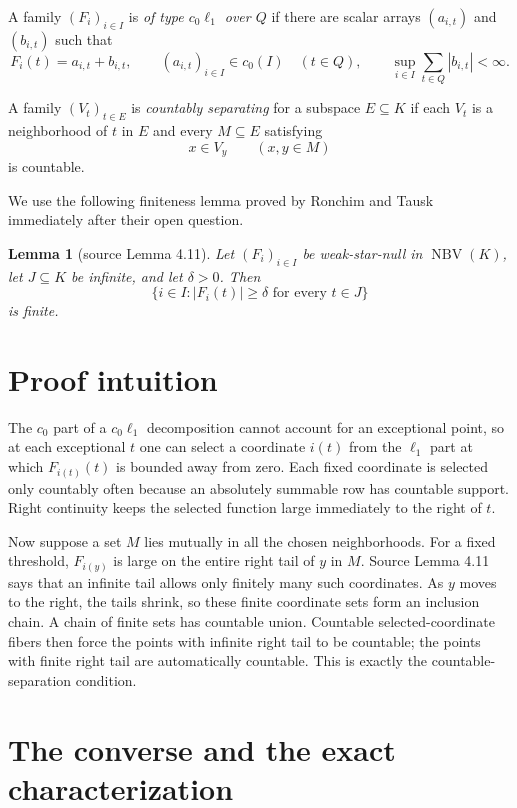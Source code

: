 \documentclass[11pt]{article}
\newtheorem{lemma}[theorem]{Lemma}
\newcommand{\NBV}{\operatorname{NBV}}
\begin{document}
A family $(F_i)_{i\in I}$ is \emph{of type $c_0\ell_1$ over $Q$} if there
are scalar arrays $(a_{i,t})$ and $(b_{i,t})$ such that
\[
 F_i(t)=a_{i,t}+b_{i,t},\qquad
 (a_{i,t})_{i\in I}\in c_0(I)\quad(t\in Q),
 \qquad
 \sup_{i\in I}\sum_{t\in Q}|b_{i,t}|<\infty.
\]

A family $(V_t)_{t\in E}$ is \emph{countably separating} for a subspace
$E\subseteq K$ if each $V_t$ is a neighborhood of $t$ in $E$ and every
$M\subseteq E$ satisfying
\[
 x\in V_y\qquad(x,y\in M)
\]
is countable.

We use the following finiteness lemma proved by Ronchim and Tausk immediately
after their open question.

\begin{lemma}[source Lemma 4.11]\label{lem:source}
Let $(F_i)_{i\in I}$ be weak-star-null in $\NBV(K)$, let $J\subseteq K$ be
infinite, and let $\delta>0$. Then
\[
 \{i\in I: |F_i(t)|\geq\delta\text{ for every }t\in J\}
\]
is finite.
\end{lemma}

\section{Proof intuition}

The $c_0$ part of a $c_0\ell_1$ decomposition cannot account for an
exceptional point, so at each exceptional $t$ one can select a coordinate
$i(t)$ from the $\ell_1$ part at which $F_{i(t)}(t)$ is bounded away from
zero. Each fixed coordinate is selected only countably often because an
absolutely summable row has countable support. Right continuity keeps the
selected function large immediately to the right of $t$.

Now suppose a set $M$ lies mutually in all the chosen neighborhoods. For a
fixed threshold, $F_{i(y)}$ is large on the entire right tail of $y$ in
$M$. Source Lemma 4.11 says that an infinite tail allows only finitely many
such coordinates. As $y$ moves to the right, the tails shrink, so these
finite coordinate sets form an inclusion chain. A chain of finite sets has
countable union. Countable selected-coordinate fibers then force the points
with infinite right tail to be countable; the points with finite right tail
are automatically countable. This is exactly the countable-separation
condition.

\section{The converse and the exact characterization}
\end{document}

